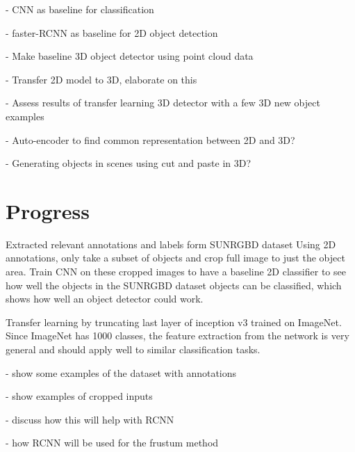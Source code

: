 \documentclass[11pt]{article}
\begin{document}
- CNN as baseline for classification

- faster-RCNN as baseline for 2D object detection

- Make baseline 3D object detector using point cloud data

- Transfer 2D model to 3D, elaborate on this

- Assess results of transfer learning 3D detector with a few 3D new object examples

- Auto-encoder to find common representation between 2D and 3D?

- Generating objects in scenes using cut and paste in 3D?

\section{Progress}

Extracted relevant annotations and labels form SUNRGBD dataset
Using 2D annotations, only take a subset of objects and crop full image to just the object area.
Train CNN on these cropped images to have a baseline 2D classifier to see how well the objects in the SUNRGBD dataset objects can be classified, which shows how well an object detector could work.

Transfer learning by truncating last layer of inception v3 trained on ImageNet. Since ImageNet has 1000 classes, the feature extraction from the network is very general and should apply well to similar classification tasks.

- show some examples of the dataset with annotations

- show examples of cropped inputs

- discuss how this will help with RCNN

- how RCNN will be used for the frustum method




\end{document}
